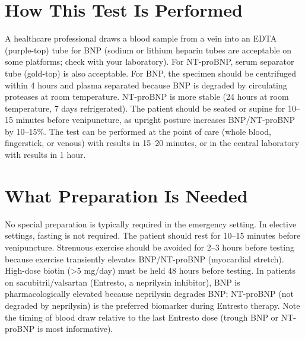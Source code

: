 \section*{How This Test Is Performed}
A healthcare professional draws a blood sample from a vein into an EDTA (purple-top) tube for BNP (sodium or lithium heparin tubes are acceptable on some platforms; check with your laboratory). For NT-proBNP, serum separator tube (gold-top) is also acceptable. For BNP, the specimen should be centrifuged within 4 hours and plasma separated because BNP is degraded by circulating proteases at room temperature. NT-proBNP is more stable (24 hours at room temperature, 7 days refrigerated). The patient should be seated or supine for 10--15 minutes before venipuncture, as upright posture increases BNP/NT-proBNP by 10--15\%. The test can be performed at the point of care (whole blood, fingerstick, or venous) with results in 15--20 minutes, or in the central laboratory with results in 1 hour.

\section*{What Preparation Is Needed}
No special preparation is typically required in the emergency setting. In elective settings, fasting is not required. The patient should rest for 10--15 minutes before venipuncture. Strenuous exercise should be avoided for 2--3 hours before testing because exercise transiently elevates BNP/NT-proBNP (myocardial stretch). High-dose biotin (>5 mg/day) must be held 48 hours before testing. In patients on sacubitril/valsartan (Entresto, a neprilysin inhibitor), BNP is pharmacologically elevated because neprilysin degrades BNP; NT-proBNP (not degraded by neprilysin) is the preferred biomarker during Entresto therapy. Note the timing of blood draw relative to the last Entresto dose (trough BNP or NT-proBNP is most informative).

